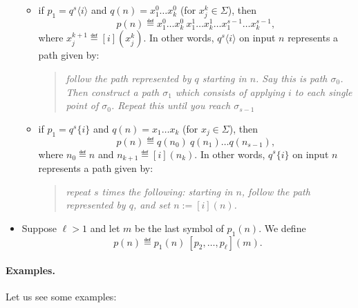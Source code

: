 \begin{itemize}
\begin{itemize}
	\item if $p_1=q^s\langle i\rangle$ and  $q(n)=x^0_1\dots x^0_k$ (for $x^k_j\in\Sigma$), then
	$$
	p(n)\eqdef x^0_1\dots x^0_k \ x^1_1\dots x^1_k \dots x^{s-1}_1\dots x^{s-1}_k,
	$$
	where $x^{k+1}_j\eqdef [i](x^k_j)$. In other words, $q^s\langle i\rangle$ on input $n$ represents a path given by:
	\begin{quote}\em
	follow the path represented by $q$ starting in $n$. Say this is path $\sigma_0$. Then construct a path $\sigma_1$ which consists of applying $i$ to each single point of $\sigma_0$. Repeat this until you reach $\sigma_{s-1}$
	\end{quote}
	
	\item if $p_1=q^s\{i\}$ and  $q(n)=x_1\dots x_k$ (for $x_j\in\Sigma$), then
	$$
	p(n)\eqdef q(n_0)\ q(n_1)\dots q(n_{s-1}),
	$$
	where $n_0\eqdef n$ and $n_{k+1}\eqdef [i](n_k)$. In other words, $q^s\{ i\}$ on input $n$ represents a path given by:
	\begin{quote}\em
	repeat $s$ times the following:  starting in $n$, follow the path represented by $q$, and set $n:=[i](n)$.
	\end{quote}
	
	
	
	\end{itemize}
	



\item Suppose $\ell>1$ and let $m$ be the last symbol of $p_1(n)$. We define
$$
p(n)\eqdef p_1(n) \ [p_2,\dots,p_\ell](m).
$$

\end{itemize}

\paragraph{Examples.}
Let us see some examples:

